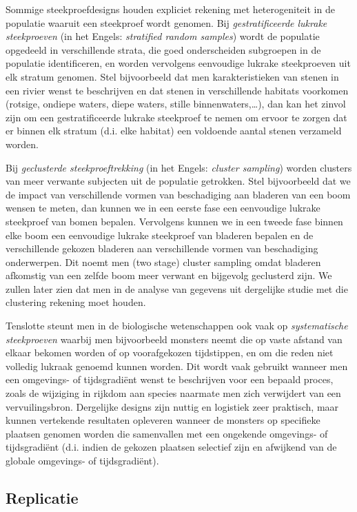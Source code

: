 \documentclass[
  12pt,dutch,coursenotes]{book}
\begin{document}
Sommige steekproefdesigns houden expliciet rekening met heterogeniteit in de populatie waaruit een steekproef wordt genomen. Bij \emph{gestratificeerde lukrake steekproeven} (in het Engels: \emph{stratified random samples}) wordt de populatie opgedeeld in verschillende strata, die goed onderscheiden subgroepen in de populatie identificeren, en worden vervolgens eenvoudige lukrake steekproeven uit elk stratum genomen. Stel bijvoorbeeld dat men karakteristieken van stenen in een rivier wenst te beschrijven en dat stenen in verschillende habitats voorkomen (rotsige, ondiepe waters, diepe waters, stille binnenwaters,\ldots), dan kan het zinvol zijn om een gestratificeerde lukrake steekproef te nemen om ervoor te zorgen dat er binnen elk stratum (d.i. elke habitat) een voldoende aantal stenen verzameld worden.

Bij \emph{geclusterde steekproeftrekking} (in het Engels: \emph{cluster sampling}) worden clusters van meer verwante subjecten uit de populatie getrokken. Stel bijvoorbeeld dat we de impact van verschillende vormen van beschadiging aan bladeren van een boom wensen te meten, dan kunnen we in een eerste fase een eenvoudige lukrake steekproef van bomen bepalen. Vervolgens kunnen we in een tweede fase binnen elke boom een eenvoudige lukrake steekproef van bladeren bepalen en de verschillende gekozen bladeren aan verschillende vormen van beschadiging onderwerpen. Dit noemt men (two stage) cluster sampling omdat bladeren afkomstig van een zelfde boom meer verwant en bijgevolg geclusterd zijn. We zullen later zien dat men in de analyse van gegevens uit dergelijke studie met die clustering rekening moet houden.

Tenslotte steunt men in de biologische wetenschappen ook vaak op \emph{systematische steekproeven} waarbij men bijvoorbeeld monsters neemt die op vaste afstand van elkaar bekomen worden of op voorafgekozen tijdstippen, en om die reden niet volledig lukraak genoemd kunnen worden. Dit wordt vaak gebruikt wanneer men een omgevings- of tijdsgradiënt wenst te beschrijven voor een bepaald proces, zoals de wijziging in rijkdom aan species naarmate men zich verwijdert van een vervuilingsbron. Dergelijke designs zijn nuttig en logistiek zeer praktisch, maar kunnen vertekende resultaten opleveren wanneer de monsters op specifieke plaatsen genomen worden die samenvallen met een ongekende omgevings- of tijdsgradiënt (d.i. indien de gekozen plaatsen selectief zijn en afwijkend van de globale omgevings- of tijdsgradiënt).

\hypertarget{replicatie}{%
\subsection{Replicatie}\label{replicatie}}
\end{document}
